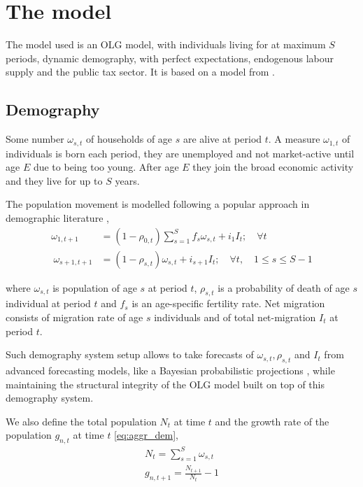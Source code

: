 \section{The model}
\label{sec:model}

The model used is an \ac{OLG} model, with individuals living for at maximum $S$ periods, dynamic demography, with perfect expectations, endogenous labour supply and the public tax sector. It is based on a model from \textcolor{Fuchsia}{\cite{evans2017}}. 

\subsection{Demography}
\label{subsec:demography}

Some number $\omega_{s,t}$ of households of age $s$ are alive at period $t$. A measure $\omega_{1,t}$ of individuals is born each period, they are unemployed and not market-active until age $E$ due to being too young. After age $E$ they join the broad economic activity and they live for up to $S$ years. 

The population movement is modelled following a popular approach in demographic literature \textcolor{Fuchsia}{\cite{raftery2023}}, 
\begin{equation} \label{eq:demography}
    \begin{aligned}
        \omega_{1, t+1} &= (1 - \rho_{0,t}) \sum_{s=1}^{S} f_s \omega_{s,t} + i_1 I_t; \quad \forall t \\
        \
        \omega_{s+1, t+1} &= (1 - \rho_{s,t}) \omega_{s,t} + i_{s+1} I_t; \quad \forall t, \quad 1 \leq s \leq S-1
    \end{aligned}
\end{equation}

\noindent where $\omega_{s,t}$ is population of age $s$ at period $t$, $\rho_{s,t}$ is a probability of death of age $s$ individual at period $t$ and $f_s$ is an age-specific fertility rate. Net migration consists of migration rate of age $s$ individuals and of total net-migration $I_t$ at period $t$.

Such demography system setup allows to take forecasts of $\omega_{s,t}, \rho_{s,t}$ and $I_t$ from advanced forecasting models, like a Bayesian probabilistic projections \textcolor{Fuchsia}{\cite{raftery2012}}, while maintaining the structural integrity of the OLG model built on top of this demography system.

We also define the total population $N_t$ at time $t$ and the growth rate of the population $g_{n,t}$ at time $t$ \textcolor{Fuchsia}{\eqref{eq:aggr_dem}},
\begin{equation} \label{eq:aggr_dem}
    \begin{aligned}
        N_t = \sum^S_{s=1}\omega_{s,t}
        \\
        g_{n,t+1} = \frac{N_{t+1}}{N_t} -1
    \end{aligned}
\end{equation}

